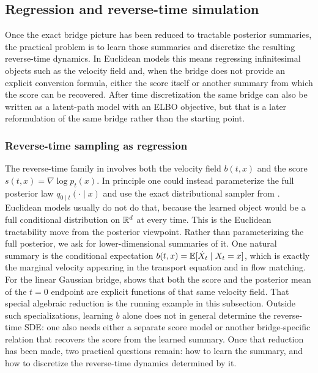 \subsection{Regression and reverse-time simulation}
\label{subsec:diffusion-regression-simulation}

Once the exact bridge picture has been reduced to tractable posterior summaries, the practical problem is to learn those summaries and discretize the resulting reverse-time dynamics.
In Euclidean models this means regressing infinitesimal objects such as the velocity field and, when the bridge does not provide an explicit conversion formula, either the score itself or another summary from which the score can be recovered.
After time discretization the same bridge can also be written as a latent-path model with an ELBO objective, but that is a later reformulation of the same bridge rather than the starting point.

\subsubsection{Reverse-time sampling as regression}

The reverse-time family in  involves both the velocity field \(b(t,x)\) and the score \(s(t,x)=\nabla\log p_t(x)\).
In principle one could instead parameterize the full posterior law \(q_{0\mid t}(\cdot\mid x)\) and use the exact distributional sampler from .
Euclidean models usually do not do that, because the learned object would be a full conditional distribution on \(\mathbb{R}^d\) at every time.
This is the Euclidean tractability move from the posterior viewpoint.
Rather than parameterizing the full posterior, we ask for lower-dimensional summaries of it.
One natural summary is the conditional expectation \(b(t,x)=\mathbb{E}[\dot X_t\mid X_t=x]\), which is exactly the marginal velocity appearing in the transport equation and in flow matching.
For the linear Gaussian bridge,  shows that both the score and the posterior mean of the \(t=0\) endpoint are explicit functions of that same velocity field.
That special algebraic reduction is the running example in this subsection.
Outside such specializations, learning \(b\) alone does not in general determine the reverse-time SDE: one also needs either a separate score model or another bridge-specific relation that recovers the score from the learned summary.
Once that reduction has been made, two practical questions remain:
how to learn the summary, and how to discretize the reverse-time dynamics determined by it.

